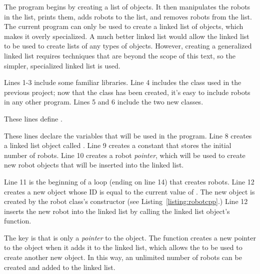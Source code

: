 The program begins by creating a list of  objects.  It then manipulates the robots in the list, prints them, adds robots to the list, and removes robots from the list.  
The current program can only be used to create a linked list of  objects, which makes it overly specialized.  A much better linked list would allow the linked list to be used to create lists of any types of objects.  However, creating a generalized linked list requires techniques that are beyond the scope of this text, so the simpler, specialized linked list is used.


Lines 1-3 include some familiar libraries.  Line 4 includes the  class used in the previous project; now that the  class has been created, it's easy to include robots in any other program.  Lines 5 and 6 include the two new classes. 


These lines define .


These lines declare the variables that will be used in the program.  Line 8 creates a linked list object called . 
Line 9 creates a constant  that stores the initial number of robots.   Line 10 creates a robot \emph{pointer}, which will be used to create new robot objects that will be inserted into the linked list.


Line 11 is the beginning of a  loop (ending on line 14) that creates  robots.  Line 12 creates a new  object whose ID is equal to the current value of .  The new  object is created by the robot class's constructor (see Listing~\ref{listing:robotcpp}.)  Line 12 inserts the new robot into the linked list by calling the linked list object's  function.   

The key is that  is only a \emph{pointer} to the  object.  The  function creates a new pointer to the  object when it adds it to the linked list, which allows the  to be used to create another new  object.  In this way, an unlimited number of robots can be created and added to the linked list.

